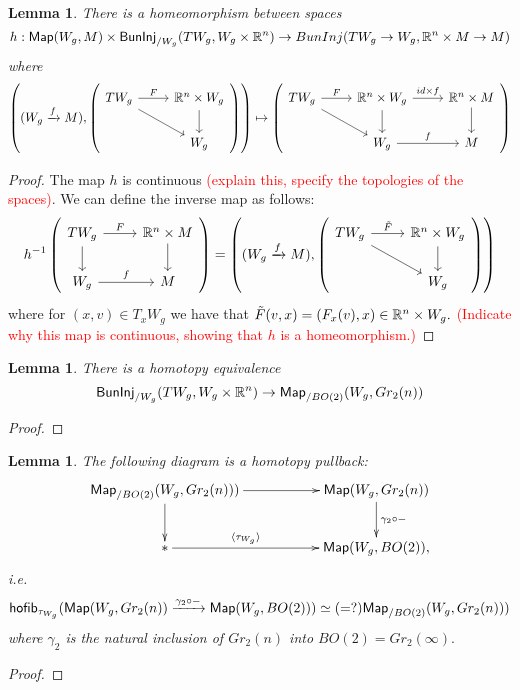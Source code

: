 \documentclass{amsart}
\newtheorem{lemma}[theorem]{Lemma}
\theoremstyle{definition}
\theoremstyle{remark}
\newcommand{\xra}{\xrightarrow}
\begin{document}
\begin{lemma} \label{l1}
There is a homeomorphism between spaces $$h: {\sf Map}(W_{g}, M) \times {\sf BunInj}_{/W_{g}}(TW_{g}, W_{g} \times \mathbb R^{n}) \rightarrow BunInj(TW_{g} \rightarrow W_{g}, \mathbb R^{n} \times M \rightarrow M)$$ where $$\left( (W_{g} \xra{f} M), \left(\begin{tikzcd}
TW_{g} \arrow[rd] \arrow[r, "F"]  & \RR^{n} \times W_{g} \arrow[d]\\
& W_{g}
\end{tikzcd} \right) \right)
\mapsto \left(
\begin{tikzcd}
TW_{g} \arrow[rd] \arrow[r, "F"] & \RR^{n} \times W_{g} \arrow[d]  \arrow[r, "id \times f"]& \RR^{n} \times M \arrow[d] \\
& W_{g} \arrow[r, "f"] & M
\end{tikzcd} \right)
$$
\end{lemma}
\begin{proof}
The map $h$ is continuous \textcolor{red}{(explain this, specify the topologies of the spaces)}.
We can define the inverse map as follows:
$$h^{-1}\left(\begin{tikzcd}
TW_{g} \arrow[d] \arrow[r, "F"]  & \RR^{n} \times M \arrow[d]\\
W_{g} \arrow[r, "f"] & M
\end{tikzcd} \right) =
\left( (W_{g} \xra{f} M), \left(\begin{tikzcd}
TW_{g} \arrow[rd] \arrow[r, "\tilde{F}"]  & \RR^{n} \times W_{g} \arrow[d]\\
& W_{g}
\end{tikzcd} \right) \right)
$$
where for $(x, v) \in T_{x}W_{g}$ we have that $\tilde{F}(v, x) = (F_{x}(v), x) \in \mathbb R^{n} \times W_{g}.$ \textcolor{red}{(Indicate why this map is continuous, showing that $h$ is a homeomorphism.)}
\end{proof}

\begin{lemma} \label{l2}
There is a homotopy equivalence $${\sf BunInj}_{/W_{g}}(TW_{g}, W_{g} \times \mathbb R^{n}) \rightarrow {\sf Map}_{/BO(2)}(W_{g}, Gr_{2}(n))$$
\end{lemma}
\begin{proof}

\end{proof}

\begin{lemma} \label{l3}
The following diagram is a homotopy pullback:
$$
\xymatrix{
{\sf Map}_{/BO(2)}(W_{g}, Gr_{2}(n))) \ar[rr]^-{} \ar[d]^-{}
&&
{\sf Map}(W_{g}, Gr_{2}(n)) \ar[d]^-{\gamma_{2} \circ -}
\\
\ast \ar[rr]^-{\langle \tau_{W_{g}} \rangle}
&&
{\sf Map}(W_{g}, BO(2))
,
}$$ 
i.e. $${\sf hofib}_{\tau_{W_{g}}}({\sf Map}(W_{g}, Gr_{2}(n)) \xra{\gamma_{2} \circ -} {\sf Map}(W_{g}, BO(2))) \simeq  (=?){\sf Map}_{/BO(2)}(W_{g}, Gr_{2}(n)))$$ where $\gamma_{2}$ is the natural inclusion of $Gr_{2}(n)$ into $BO(2) = Gr_{2}(\infty).$
\end{lemma}
\begin{proof}

\end{proof}
\end{document}

